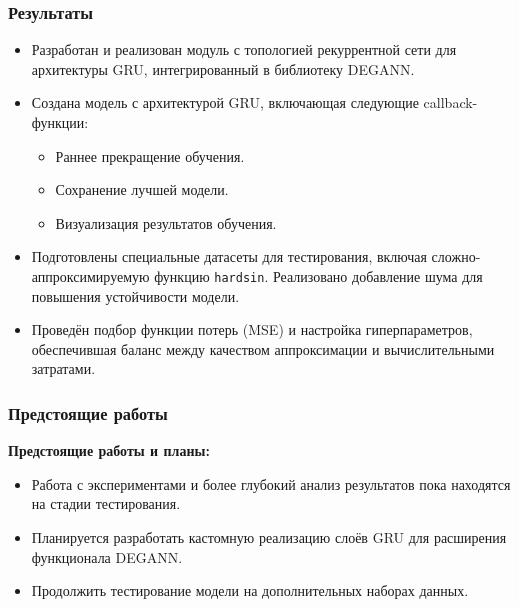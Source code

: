 \documentclass
  [ russian
  , aspectratio=1610 %
  ] {beamer}
\begin{document}
\begin{frame}
    \frametitle{Результаты}
    \begin{itemize}
        \item Разработан и реализован модуль с топологией рекуррентной сети для архитектуры GRU, интегрированный в библиотеку DEGANN.
        \item Создана модель с архитектурой GRU, включающая следующие callback-функции:
        \begin{itemize}
            \item Раннее прекращение обучения.
            \item Сохранение лучшей модели.
            \item Визуализация результатов обучения.
        \end{itemize}
        \item Подготовлены специальные датасеты для тестирования, включая сложно-аппроксимируемую функцию \texttt{hardsin}. Реализовано добавление шума для повышения устойчивости модели.
        \item Проведён подбор функции потерь (MSE) и настройка гиперпараметров, обеспечившая баланс между качеством аппроксимации и вычислительными затратами.
    \end{itemize}
\end{frame}


\begin{frame}
    \frametitle{Предстоящие работы}
    \textbf{Предстоящие работы и планы:}
        \begin{itemize}
            \item Работа с экспериментами и более глубокий анализ результатов пока находятся на стадии тестирования.
            \item Планируется разработать кастомную реализацию слоёв GRU для расширения функционала DEGANN.
            \item Продолжить тестирование модели на дополнительных наборах данных.
        \end{itemize}
    \end{frame}
\end{document}
